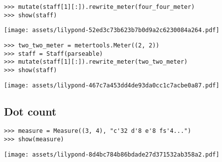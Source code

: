 \begin{comment}
<abjad>
mutate(staff[1][:]).rewrite_meter(four_four_meter)
show(staff)
</abjad>
\end{comment}

\begin{singlespacing}
\vspace{-0.5\baselineskip}
\begin{lstlisting}
>>> mutate(staff[1][:]).rewrite_meter(four_four_meter)
>>> show(staff)
\end{lstlisting}
\texttt{[image: assets/lilypond-52ed3c73b623b7b0d9a2c6230084a264.pdf]}
\end{singlespacing}

\begin{comment}
<abjad>
two_two_meter = metertools.Meter((2, 2))
staff = Staff(parseable)
mutate(staff[1][:]).rewrite_meter(two_two_meter)
show(staff)
</abjad>
\end{comment}

\begin{singlespacing}
\vspace{-0.5\baselineskip}
\begin{lstlisting}
>>> two_two_meter = metertools.Meter((2, 2))
>>> staff = Staff(parseable)
>>> mutate(staff[1][:]).rewrite_meter(two_two_meter)
>>> show(staff)
\end{lstlisting}
\texttt{[image: assets/lilypond-467c7a453dd4de93da0cc1c7acbe0a87.pdf]}
\end{singlespacing}

\subsection{Dot count} %

\begin{comment}
<abjad>
measure = Measure((3, 4), "c'32 d'8 e'8 fs'4...")
show(measure)
</abjad>
\end{comment}

\begin{singlespacing}
\vspace{-0.5\baselineskip}
\begin{lstlisting}
>>> measure = Measure((3, 4), "c'32 d'8 e'8 fs'4...")
>>> show(measure)
\end{lstlisting}
\texttt{[image: assets/lilypond-8d4bc784b86bdade27d371532ab358a2.pdf]}
\end{singlespacing}

